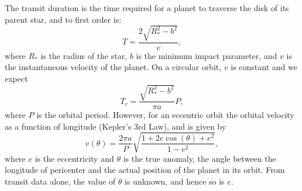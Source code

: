 The transit duration is the time required for a planet to traverse the
disk of its parent star, and to first order is:
\begin{equation}\label{eq:duration}
T = \frac{2 \sqrt{R_*^2 - b^2}}{v},
\end{equation}
where $R_*$ is the radius of the star, $b$ is the minimum impact parameter,
and $v$ is the instantaneous velocity of the planet. On a circular
orbit, $v$ is constant and we expect
\begin{equation}\label{eq:durcirc}
T_c = \frac{\sqrt{R_*^2 - b^2}}{\pi a}P,
\end{equation}
where $P$ is the orbital period. However, for an eccentric orbit the
orbital velocity as a function of longitude (Kepler's 3rd Law), and is
given by
\begin{equation}\label{eq:velocity}
v(\theta) = \frac{2\pi a}{P}\sqrt{\frac{1 + 2e\cos(\theta) + e^2}{1-e^2}},
\end{equation}
where $e$ is the eccentricity and $\theta$ is the true anomaly, the
angle between the longitude of pericenter and the actual position of
the planet in its orbit. From transit data alone, the value of
$\theta$ is unknown, and hence so is $e$.

